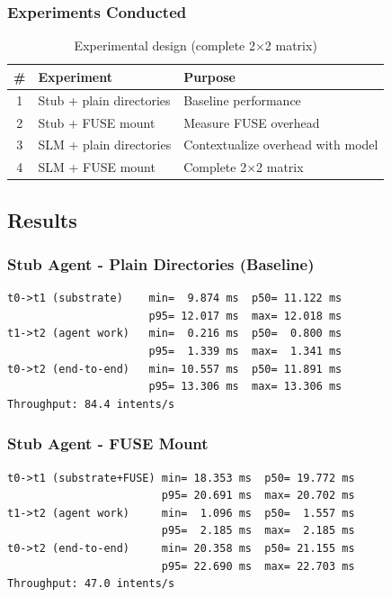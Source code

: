 \documentclass[11pt]{article}
\begin{document}
\subsubsection{Experiments Conducted}

\begin{table}[h]
\centering
\begin{tabular}{clp{6cm}}
\toprule
\textbf{\#} & \textbf{Experiment} & \textbf{Purpose} \\
\midrule
1 & Stub + plain directories & Baseline performance \\
2 & Stub + FUSE mount & Measure FUSE overhead \\
3 & SLM + plain directories & Contextualize overhead with model \\
4 & SLM + FUSE mount & Complete 2×2 matrix \\
\bottomrule
\end{tabular}
\caption{Experimental design (complete 2×2 matrix)}
\end{table}

\subsection{Results}

\subsubsection{Stub Agent - Plain Directories (Baseline)}

\begin{lstlisting}
t0->t1 (substrate)    min=  9.874 ms  p50= 11.122 ms
                      p95= 12.017 ms  max= 12.018 ms
t1->t2 (agent work)   min=  0.216 ms  p50=  0.800 ms
                      p95=  1.339 ms  max=  1.341 ms
t0->t2 (end-to-end)   min= 10.557 ms  p50= 11.891 ms
                      p95= 13.306 ms  max= 13.306 ms
Throughput: 84.4 intents/s
\end{lstlisting}

\subsubsection{Stub Agent - FUSE Mount}

\begin{lstlisting}
t0->t1 (substrate+FUSE) min= 18.353 ms  p50= 19.772 ms
                        p95= 20.691 ms  max= 20.702 ms
t1->t2 (agent work)     min=  1.096 ms  p50=  1.557 ms
                        p95=  2.185 ms  max=  2.185 ms
t0->t2 (end-to-end)     min= 20.358 ms  p50= 21.155 ms
                        p95= 22.690 ms  max= 22.703 ms
Throughput: 47.0 intents/s
\end{lstlisting}
\end{document}
